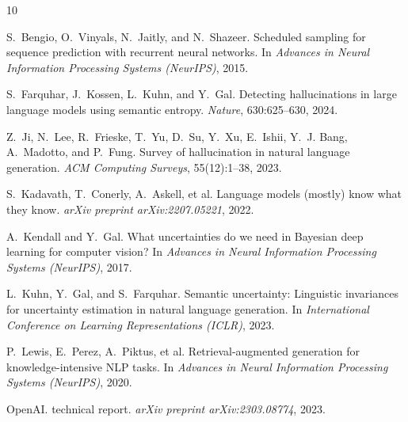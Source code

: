 \documentclass[11pt]{article}
\begin{document}

\begin{thebibliography}{10}

S.~Bengio, O.~Vinyals, N.~Jaitly, and N.~Shazeer.
\newblock Scheduled sampling for sequence prediction with recurrent neural networks.
\newblock In \emph{Advances in Neural Information Processing Systems (NeurIPS)}, 2015.

S.~Farquhar, J.~Kossen, L.~Kuhn, and Y.~Gal.
\newblock Detecting hallucinations in large language models using semantic entropy.
\newblock \emph{Nature}, 630:625--630, 2024.

Z.~Ji, N.~Lee, R.~Frieske, T.~Yu, D.~Su, Y.~Xu, E.~Ishii, Y.~J. Bang, A.~Madotto, and P.~Fung.
\newblock Survey of hallucination in natural language generation.
\newblock \emph{ACM Computing Surveys}, 55(12):1--38, 2023.

S.~Kadavath, T.~Conerly, A.~Askell, et al.
\newblock Language models (mostly) know what they know.
\newblock \emph{arXiv preprint arXiv:2207.05221}, 2022.

A.~Kendall and Y.~Gal.
\newblock What uncertainties do we need in Bayesian deep learning for computer vision?
\newblock In \emph{Advances in Neural Information Processing Systems (NeurIPS)}, 2017.

L.~Kuhn, Y.~Gal, and S.~Farquhar.
\newblock Semantic uncertainty: Linguistic invariances for uncertainty estimation in natural language generation.
\newblock In \emph{International Conference on Learning Representations (ICLR)}, 2023.

P.~Lewis, E.~Perez, A.~Piktus, et al.
\newblock Retrieval-augmented generation for knowledge-intensive NLP tasks.
\newblock In \emph{Advances in Neural Information Processing Systems (NeurIPS)}, 2020.

OpenAI.
 technical report.
\newblock \emph{arXiv preprint arXiv:2303.08774}, 2023.

\end{thebibliography}
\end{document}
